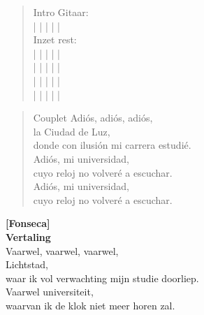 
\begin{verse}{Intro}
Gitaar:\\
|  \hspace{4em} | \hspace{5.5em} | \hspace{5.5em} | \hspace{5.5em} |\\
Inzet rest:\\
|  \hspace{4em} | \hspace{5.5em} |  \hspace{3.6em} | \hspace{ 5.5em} |\\
|  \hspace{4.35em} | \hspace{5.5em} |  \hspace{3.6em} |  \hspace{4em} |\\
|  \hspace{4em} | \hspace{5.5em} |  \hspace{3.6em} | \hspace{ 5.5em} |\\
|  \hspace{4.35em} | \hspace{5.5em} |  \hspace{3.6em} | \hspace{ 5.5em} |\\

\measure{}\measure{}\measure{}\measure{}\measure{}\measure{}\measure{}\measure{}
\end{verse}

\begin{verse}{Couplet}
Adiós, adiós, adiós,\\
\chord{}la Ciudad de Luz,\\
donde con ilusión mi carrera estudié.\\
Adiós, mi universidad,\\
cuyo reloj no volveré a escuchar.\\
Adiós, mi universidad,\\
cuyo reloj no volveré a escuchar.\\
\end{verse}

\textbf{[Fonseca]}\\
\vspace{10em}
\textbf{Vertaling}\\
Vaarwel, vaarwel, vaarwel,\\
Lichtstad,\\
waar ik vol verwachting mijn studie doorliep.\\
Vaarwel universiteit,\\
waarvan ik de klok niet meer horen zal.\\